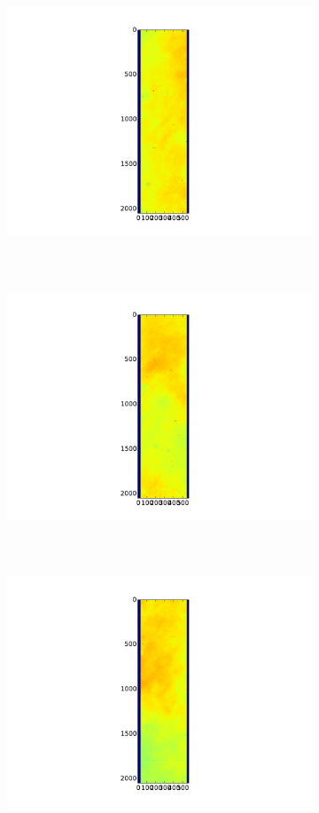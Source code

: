 \documentclass[a4paper, 11pt, spanish]{article}
\begin{document}
\begin{figure}[!ht]
\centering
\begin{subfigure}{.5\textwidth}
  \centering
  \includegraphics[width=10cm, height=8cm]{img/flats 1.pdf}
  \caption{}
  \label{fig:flat1}
\end{subfigure}%
\begin{subfigure}{.5\textwidth}
  \centering
  \includegraphics[width=10cm, height=8cm]{img/flats 2.pdf}
  \caption{}
  \label{fig:flat2}
\end{subfigure}
\begin{subfigure}{.5\textwidth}
  \centering
  \includegraphics[width=10cm, height=8cm]{img/flats 3.pdf}

\end{subfigure}
\end{figure}
\end{document}
